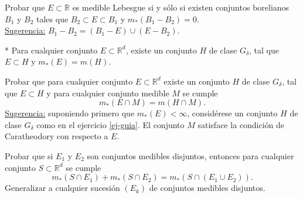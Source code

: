 \documentclass{book}
\newcommand{\rr}{\mathbb{R}}
\newcommand{\di}{\displaystyle}
\begin{document}
	
 

\begin{ejer}{}
Probar que $E\subset \rr$ es medible Lebesgue si y s\'olo si existen conjuntos borelianos $B_1$
 y $B_2$ tales que $B_2\subset E\subset B_1$ y $m_*(B_1-B_2)=0$.
\\
\underline{Sugerencia:} $B_1-B_2=(B_1-E)\cup (E-B_2)$. 
\end{ejer} 


 \begin{ejer}{}*
	\label{ej-guia}
  Para cualquier conjunto $E \subset \rr^d$, existe un conjunto $H$ de clase $G_{\delta}$,
  tal que $E \subset H$ y $m_*(E)=m(H)$.
	\end{ejer} 


  \begin{ejer}{}
	Probar que para cualquier  conjunto $E \subset \rr^d$ existe un conjunto $H$ de
  clase $G_{\delta}$, tal que $E \subset H$ y para cualquier conjunto medible $M$ se cumple
  $$m_*(E \cap M)=m(H\cap M).$$
  \underline{Sugerencia:} suponiendo primero que $m_*(E)<\infty$, considérese un conjunto
  $H$ de clase $G_{\delta}$ como en el ejercicio \ref{ej-guia}. El conjunto $M$ satisface la
  condición de Caratheodory con respecto a $E$.
   \end{ejer} 

   \begin{ejer}{}
	Probar que si $E_1$ y $E_2$ son conjuntos medibles disjuntos, entonces para cualquier
  conjunto $S \subset \rr^d$ se cumple 
  $$m_*(S\cap E_1)+m_*(S\cap E_2)=m_*(S\cap(E_1\cup E_2)). $$
  Generalizar a cualquier sucesión $(E_k)$ de conjuntos medibles disjuntos.
   \end{ejer} 
\end{document}
